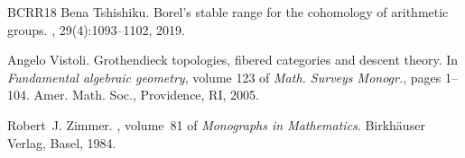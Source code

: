 \begin{thebibliography}{BCRR18}
Bena Tshishiku.
\newblock Borel's stable range for the cohomology of arithmetic groups.
, 29(4):1093--1102, 2019.

Angelo Vistoli.
\newblock Grothendieck topologies, fibered categories and descent theory.
\newblock In {\em Fundamental algebraic geometry}, volume 123 of {\em Math.
  Surveys Monogr.}, pages 1--104. Amer. Math. Soc., Providence, RI, 2005.

Robert~J. Zimmer.
, volume~81 of {\em
  Monographs in Mathematics}.
\newblock Birkh\"{a}user Verlag, Basel, 1984.

\end{thebibliography}

